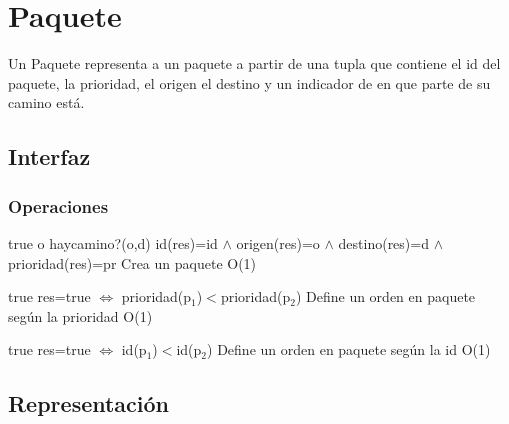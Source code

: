 \section{Paquete}

Un Paquete representa a un paquete a partir de una tupla que contiene el id del paquete, la prioridad, el origen el destino y un indicador de en que parte de su camino est\'a. 

\subsection{Interfaz}



\subsubsection*{Operaciones}

 {true o haycamino?(o,d)}
 {id(res)=id $\land$ origen(res)=o $\land$ destino(res)=d $\land$ prioridad(res)=pr}
 {Crea un paquete}
 {O(1)}
 {} 
 
 {true}
 {res=true $\iff$ prioridad(p$_1$)$<$prioridad(p$_2$)}
 {Define un orden en paquete seg\'un la prioridad}
 {O(1)}
 {}
 
 {true}
 {res=true $\iff$ id(p$_1$)$<$id(p$_2$)}
 {Define un orden en paquete seg\'un la id}
 {O(1)}
 {}
 
\subsection{Representación}

 